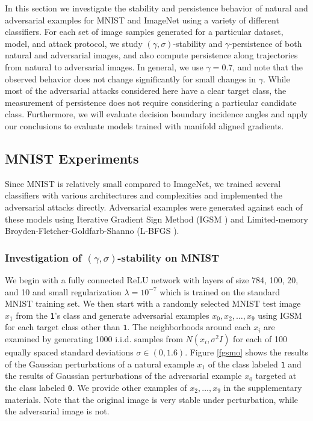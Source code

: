 In this section we investigate the stability and persistence behavior of natural and adversarial examples for MNIST \citep{MNIST} and ImageNet \citep{ILSVRC15} using a variety of different classifiers. For each set of image samples generated for a particular dataset, model, and attack protocol, we study $(\gamma,\sigma)$-stability and $\gamma$-persistence of both natural and adversarial images, and also compute persistence along trajectories from natural to adversarial images. In general, we use $\gamma = 0.7$, and note that the observed behavior does not change significantly for small changes in $\gamma$. While most of the adversarial attacks considered here have a clear target class, the measurement of persistence does not require considering a particular candidate class.  Furthermore, we will evaluate decision boundary incidence angles and apply our conclusions to evaluate models trained with manifold aligned gradients. 

\subsection{MNIST Experiments}

Since MNIST is relatively small compared to ImageNet, we trained several classifiers with various architectures and complexities and implemented the adversarial attacks directly. Adversarial examples were generated against each of these models using Iterative Gradient Sign Method (IGSM \citep{kurakin_adversarial_2016}) and Limited-memory Broyden-Fletcher-Goldfarb-Shanno (L-BFGS \citep{liu1989limited}).

\subsubsection{Investigation of $(\gamma, \sigma)$-stability on MNIST}\label{sec:mnist}

We begin with a fully connected ReLU network with layers of size 784, 100, 20, and 10 and small regularization $\lambda = 10^{-7}$ which is trained on the standard MNIST training set. We then start with a randomly selected MNIST test image $x_1$ from the \texttt{1}'s class and generate adversarial examples $x_0,x_2,\dots,x_9$ using IGSM for each target class other than \texttt{1}. The neighborhoods around each $x_i$ are examined by generating 1000 i.i.d. samples from $N(x_i,\sigma^2I)$ for each of 100 equally spaced standard deviations $\sigma\in(0,1.6)$. Figure \ref{fgsmo} shows the results of the Gaussian perturbations of a natural example $x_1$ of the class labeled \texttt{1} and the results of Gaussian perturbations of the adversarial example $x_0$ targeted at the class labeled \texttt{0}. We provide other examples of $x_2,\ldots,x_9$ in the supplementary materials. Note that the original image is very stable under perturbation, while the adversarial image is not. 

